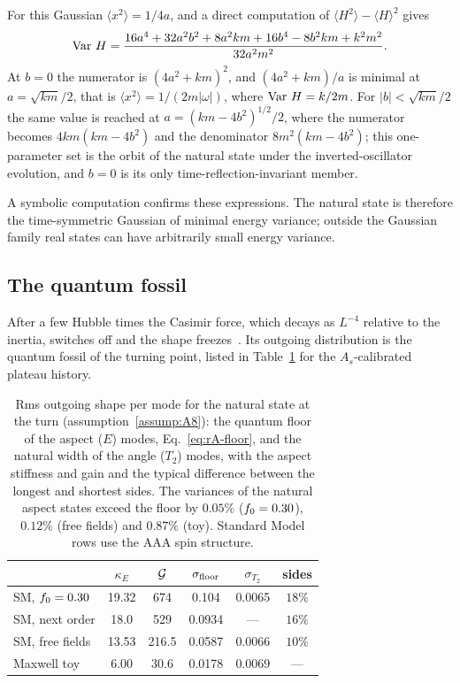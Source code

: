 \begin{rAproof}
For this Gaussian $\langle x^2\rangle=1/4a$, and a direct computation of $\langle H^2\rangle-\langle H\rangle^2$ gives
\begin{equation}
\operatorname{Var}\,H=\frac{16a^4+32a^2b^2+8a^2km+16b^4-8b^2km+k^2m^2}{32a^2m^2}.
\end{equation}
At $b=0$ the numerator is $(4a^2+km)^2$, and $(4a^2+km)/a$ is minimal at $a=\sqrt{km}/2$, that is $\langle x^2\rangle=1/(2m|\omega|)$, where $\operatorname{Var}\,H=k/2m$.
For $|b|<\sqrt{km}/2$ the same value is reached at $a=(km-4b^2)^{1/2}/2$, where the numerator becomes $4km(km-4b^2)$ and the denominator $8m^2(km-4b^2)$; this one-parameter set is the orbit of the natural state under the inverted-oscillator evolution, and $b=0$ is its only time-reflection-invariant member.
\end{rAproof}

A symbolic computation confirms these expressions. %
The natural state is therefore the time-symmetric Gaussian of minimal energy variance; outside the Gaussian family real states can have arbitrarily small energy variance.

\subsection{The quantum fossil}
\label{rA:s-fossil}

After a few Hubble times the Casimir force, which decays as $L^{-4}$ relative to the inertia, switches off and the shape freezes~\cite{Fornal:2026qfq}.
Its outgoing distribution is the quantum fossil of the turning point, listed in Table~\ref{tab:rA-fossil} for the $A_s$-calibrated plateau history.

\begin{table}[tbp]
\centering
\caption{Rms outgoing shape per mode for the natural state at the turn (assumption~\ref{assump:A8}): the quantum floor of the aspect ($E$) modes, Eq.~\eqref{eq:rA-floor}, and the natural width of the angle ($T_2$) modes, with the aspect stiffness and gain and the typical difference between the longest and shortest sides. The variances of the natural aspect states exceed the floor by $0.05\%$ ($f_0=0.30$), $0.12\%$ (free fields) and $0.87\%$ (toy). Standard Model rows use the AAA spin structure.} %
\label{tab:rA-fossil}
\begin{tabular}{lccccc}
\toprule
 & $\kappa_E$ & $\mathcal{G}$ & $\sigma_{\mathrm{floor}}$ & $\sigma_{T_2}$ & sides\\
\midrule
SM, $f_0=0.30$ & 19.32 & 674 & 0.104 & 0.0065 & $18\%$\\ %
SM, next order & 18.0 & 529 & 0.0934 & --- & $16\%$\\ %
SM, free fields & 13.53 & 216.5 & 0.0587 & 0.0066 & $10\%$\\ %
Maxwell toy & 6.00 & 30.6 & 0.0178 & 0.0069 & ---\\ %
\bottomrule
\end{tabular}
\end{table} %

